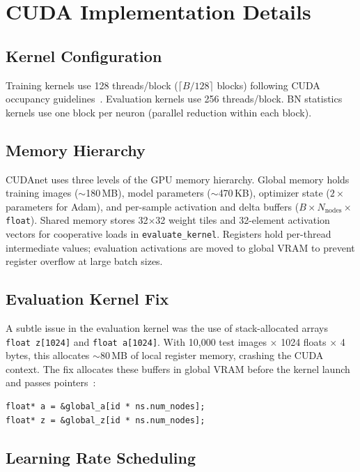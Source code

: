 \documentclass[runningheads]{llncs}
\begin{document}
\section{CUDA Implementation Details}

\subsection{Kernel Configuration}

Training kernels use 128 threads/block ($\lceil B/128 \rceil$ blocks)
following CUDA occupancy guidelines~\cite{b2}. Evaluation kernels use 256
threads/block. BN statistics kernels use one block per neuron (parallel
reduction within each block).

\subsection{Memory Hierarchy}

CUDAnet uses three levels of the GPU memory hierarchy. Global memory holds
training images ($\sim$180\,MB), model parameters ($\sim$470\,KB),
optimizer state ($2\times$ parameters for Adam), and per-sample activation
and delta buffers ($B \times N_\text{nodes} \times$\texttt{float}). Shared
memory stores 32$\times$32 weight tiles and 32-element activation vectors
for cooperative loads in \mbox{\texttt{evaluate\_kernel}}. Registers hold
per-thread intermediate values; evaluation activations are moved to global
VRAM to prevent register overflow at large batch sizes.

\subsection{Evaluation Kernel Fix}

A subtle issue in the evaluation kernel was the use of stack-allocated
arrays \texttt{float\,z[1024]} and \texttt{float\,a[1024]}. With 10,000
test images $\times$ 1024 floats $\times$ 4 bytes, this allocates
$\sim$80\,MB of local register memory, crashing the CUDA context. The fix
allocates these buffers in global VRAM before the kernel launch and passes
pointers~\cite{b16}:
\begin{verbatim}
float* a = &global_a[id * ns.num_nodes];
float* z = &global_z[id * ns.num_nodes];
\end{verbatim}

\subsection{Learning Rate Scheduling}
\end{document}
